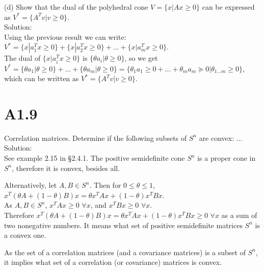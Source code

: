 \documentclass{article}
\begin{document}
(d) Show that the dual of the polyhedral cone 
$V = \{x | Ax \geq 0 \}$ can be expressed as 
$V^* = \{A^Tv | v \geq 0 \}$. \\
Solution:\\
Using the previous result we can write: \\
$V^* = \{x | a_1^Tx \geq 0 \} + \{x | a_2^Tx \geq 0 \}  + ... + \{x | a_m^Tx \geq 0 \}$. \\ The dual of 
$\{x | a_i^Tx \geq 0 \}$ is 
$\{\theta a_i | \theta \geq 0 \}$, so we get \\
$V^* = \{\theta a_1 | \theta \geq 0 \}  + ... + \{\theta a_m | \theta \geq 0 \} = 
{\{\theta_1 a_1 \geq 0 + ... + \theta_m a_m \succeq 0 | \theta_{1 ... m} \geq 0 \}}$, which can be written as $V^* = \{A^Tv | v \geq 0 \}$.

\section*{A1.9}
Correlation matrices. Determine if the following subsets of $S^n$ are convex: ...
Solution:\\
See example 2.15 in \S{2.4.1}. The positive semidefinite
cone $S^n$ is a proper cone in $S^n$, therefore it is convex, besides all. 

Alternatively, let $A, B \in S^n$. Then for 
$0 \leq \theta \leq 1$, \\ 
$x^T(\theta A + (1 - \theta) B) x = \theta x^T A x + (1-\theta) x^T B x$. 
\\As $A, B \in S^n$,  $x^T A x \geq 0$ $\forall x$, and 
$x^T B x \geq 0$ $\forall x$. \\Therefore
$x^T(\theta A + (1 - \theta) B) x = \theta x^T A x + (1-\theta) x^T B x \geq 0$ $\forall x$ as a sum of two nonegative numbers. It means what set of positive semidefinite matrices $S^n$ is a convex one.

As the set of a correlation matrices (and a covariance matrices) is a subset of $S^n$, it implies what set of a correlation (or covariance) matrices is convex.
\end{document}
